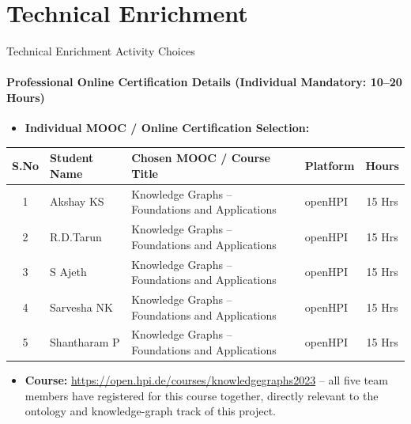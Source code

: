 \documentclass[aspectratio=169, 11pt]{beamer}
\begin{document}
\section{Technical Enrichment}

\begin{frame}{Technical Enrichment Activity Choices}
    \framesubtitle{Professional Online Certification Details (Individual Mandatory: 10--20 Hours)}
    \begin{itemize}
        \item \textbf{Individual MOOC / Online Certification Selection:}
    \end{itemize}
    \vspace{-0.1cm}
    \begin{table}
        \centering
        \footnotesize
        \renewcommand{\arraystretch}{1.15}
        \begin{tabular}{|c|p{2.8cm}|p{5.0cm}|p{2.3cm}|c|}
            \hline
            \textbf{S.No} & \textbf{Student Name} & \textbf{Chosen MOOC / Course Title} & \textbf{Platform} & \textbf{Hours} \\
            \hline
            1 & Akshay KS & Knowledge Graphs -- Foundations and Applications & openHPI & 15 Hrs \\
            \hline
            2 & R.D.Tarun & Knowledge Graphs -- Foundations and Applications & openHPI & 15 Hrs \\
            \hline
            3 & S Ajeth & Knowledge Graphs -- Foundations and Applications & openHPI & 15 Hrs \\
            \hline
            4 & Sarvesha NK & Knowledge Graphs -- Foundations and Applications & openHPI & 15 Hrs \\
            \hline
            5 & Shantharam P & Knowledge Graphs -- Foundations and Applications & openHPI & 15 Hrs \\
            \hline
        \end{tabular}
    \end{table}
    \vspace{0.1cm}
    \begin{itemize}
        \item {\scriptsize \textbf{Course:} \url{https://open.hpi.de/courses/knowledgegraphs2023} -- all five team members have registered for this course together, directly relevant to the ontology and knowledge-graph track of this project.}
    \end{itemize}
\end{frame}
\end{document}
